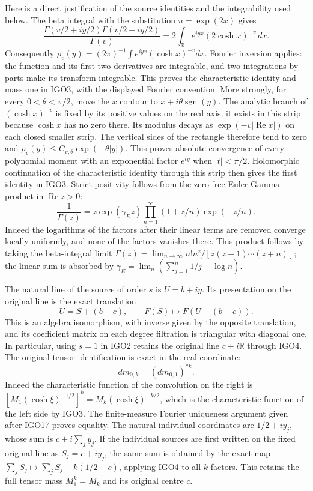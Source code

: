 Here is a direct justification of the source identities and the
integrability used below. The beta integral with the substitution
$u=\exp(2x)$ gives
\[
 \frac{\Gamma(v/2+iy/2)\Gamma(v/2-iy/2)}{\Gamma(v)}
  =2\int_{\mathbb R} e^{iyx}(2\cosh x)^{-v}\,dx.
\]
Consequently $\rho_v(y)=(2\pi)^{-1}
\int e^{iyx}(\cosh x)^{-v}dx$. Fourier inversion applies: the
function and its first two derivatives are integrable, and two
integrations by parts make its transform integrable. This proves
the characteristic identity and mass one in IGO3, with the displayed
Fourier convention. More strongly, for every $0<\theta<\pi/2$, move
the $x$ contour to $x+i\theta\operatorname{sgn}(y)$. The analytic
branch of $(\cosh x)^{-v}$ is fixed by its positive values on the
real axis; it exists in this strip because $\cosh x$ has no zero
there. Its modulus decays as $\exp(-v|\operatorname{Re}x|)$ on
each closed smaller strip. The vertical sides of the rectangle
therefore tend to zero and
$\rho_v(y)\leq C_{v,\theta}\exp(-\theta|y|)$.
This proves absolute convergence of every polynomial moment with
an exponential factor $e^{ty}$ when $|t|<\pi/2$. Holomorphic
continuation of the characteristic identity through this strip
then gives the first identity in IGO3. Strict positivity follows
from the zero-free Euler Gamma product in $\operatorname{Re}z>0$:
\[
 \frac1{\Gamma(z)}=z\exp(\gamma_{\!E}z)
       \prod_{n=1}^{\infty}(1+z/n)\exp(-z/n).
\]
Indeed the logarithms of the factors after their linear terms are
removed converge locally uniformly, and none of the factors vanishes
there. This product follows by taking the beta-integral limit
$\Gamma(z)=\lim_{n\to\infty}n!n^z/[z(z+1)\cdots(z+n)]$;
the linear sum is absorbed by
$\gamma_{\!E}=\lim_n(\sum_{j=1}^n1/j-\log n)$.

The natural line of the source of order $s$ is $U=b+iy$.
Its presentation on the original line is the exact translation
\[
 U=S+(b-c),\qquad
 F(S)\longmapsto F(U-(b-c)).
 \tag{IGO4}
\]
This is an algebra isomorphism, with inverse given by the opposite
translation, and its coefficient matrix on each degree filtration
is triangular with diagonal one. In particular, using $s=1$ in
IGO2 retains the original line $c+i\mathbb R$ through IGO4.
The original tensor identification is exact in the real coordinate:
\[
 dm_{0,k}=(dm_{0,1})^{*k}.
\]
Indeed the characteristic function of the convolution on the right
is $[M_1(\cosh\xi)^{-1/2}]^k
=M_k(\cosh\xi)^{-k/2}$, which is the characteristic function
of the left side by IGO3. The finite-measure Fourier uniqueness
argument given after IGO17 proves equality. The natural individual
coordinates are $1/2+iy_j$, whose sum is $c+i\sum_jy_j$.
If the individual sources are first written on the fixed original
line as $S_j=c+iy_j$, the same sum is obtained by the exact map
$\sum_jS_j\mapsto\sum_jS_j+k(1/2-c)$, applying IGO4 to all
$k$ factors. This retains the full tensor mass $M_1^k=M_k$
and its original centre $c$.

